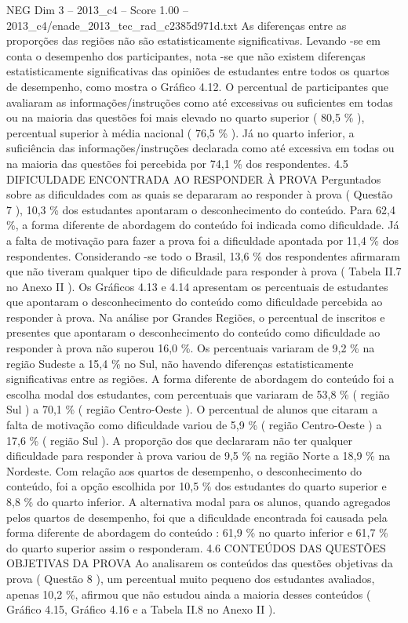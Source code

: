 \begin{textsample}{NEG Dim 3 – 2013\_c4 – Score 1.00 – 2013\_c4/enade\_2013\_tec\_rad\_c2385d971d.txt}
As diferenças entre as proporções das regiões não são estatisticamente significativas.
Levando -se em conta o desempenho dos participantes, nota -se que não existem diferenças estatisticamente significativas das opiniões de estudantes entre todos os quartos de desempenho, como mostra o Gráfico 4.12.
O percentual de participantes que avaliaram as informações/instruções como até excessivas ou suficientes em todas ou na maioria das questões foi mais elevado no quarto superior ( 80,5 \% ), percentual superior à média nacional ( 76,5 \% ).
Já no quarto inferior, a suficiência das informações/instruções declarada como até excessiva em todas ou na maioria das questões foi percebida por 74,1 \% dos respondentes. 4.5 DIFICULDADE ENCONTRADA AO RESPONDER À PROVA Perguntados sobre as dificuldades com as quais se depararam ao responder à prova ( Questão 7 ), 10,3 \% dos estudantes apontaram o desconhecimento do conteúdo.
Para 62,4 \%, a forma diferente de abordagem do conteúdo foi indicada como dificuldade.
Já a falta de motivação para fazer a prova foi a dificuldade apontada por 11,4 \% dos respondentes.
Considerando -se todo o Brasil, 13,6 \% dos respondentes afirmaram que não tiveram qualquer tipo de dificuldade para responder à prova ( Tabela II.7 no Anexo II ).
Os Gráficos 4.13 e 4.14 apresentam os percentuais de estudantes que apontaram o desconhecimento do conteúdo como dificuldade percebida ao responder à prova.
Na análise por Grandes Regiões, o percentual de inscritos e presentes que apontaram o desconhecimento do conteúdo como dificuldade ao responder à prova não superou 16,0 \%.
Os percentuais variaram de 9,2 \% na região Sudeste a 15,4 \% no Sul, não havendo diferenças estatisticamente significativas entre as regiões.
A forma diferente de abordagem do conteúdo foi a escolha modal dos estudantes, com percentuais que variaram de 53,8 \% ( região Sul ) a 70,1 \% ( região Centro-Oeste ).
O percentual de alunos que citaram a falta de motivação como dificuldade variou de 5,9 \% ( região Centro-Oeste ) a 17,6 \% ( região Sul ).
A proporção dos que declararam não ter qualquer dificuldade para responder à prova variou de 9,5 \% na região Norte a 18,9 \% na Nordeste.
Com relação aos quartos de desempenho, o desconhecimento do conteúdo, foi a opção escolhida por 10,5 \% dos estudantes do quarto superior e 8,8 \% do quarto inferior.
A alternativa modal para os alunos, quando agregados pelos quartos de desempenho, foi que a dificuldade encontrada foi causada pela forma diferente de abordagem do conteúdo : 61,9 \% no quarto inferior e 61,7 \% do quarto superior assim o responderam. 4.6 CONTEÚDOS DAS QUESTÕES OBJETIVAS DA PROVA Ao analisarem os conteúdos das questões objetivas da prova ( Questão 8 ), um percentual muito pequeno dos estudantes avaliados, apenas 10,2 \%, afirmou que não estudou ainda a maioria desses conteúdos ( Gráfico 4.15, Gráfico 4.16 e a Tabela II.8 no Anexo II ).

\end{textsample}
